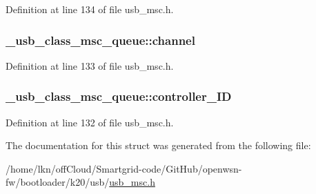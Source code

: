 Definition at line 134 of file usb\+\_\+msc.\+h.

\subsubsection[{\texorpdfstring{channel}{channel}}]{ \+\_\+usb\+\_\+class\+\_\+msc\+\_\+queue\+::channel}\hypertarget{struct__usb__class__msc__queue_a18a7ff1ffec780b13b9723f51ba3f48a}{}\label{struct__usb__class__msc__queue_a18a7ff1ffec780b13b9723f51ba3f48a}


Definition at line 133 of file usb\+\_\+msc.\+h.

\subsubsection[{\texorpdfstring{controller\+\_\+\+ID}{controller_ID}}]{ \+\_\+usb\+\_\+class\+\_\+msc\+\_\+queue\+::controller\+\_\+\+ID}\hypertarget{struct__usb__class__msc__queue_a53fdfed1c2949d468aa938771b4cb864}{}\label{struct__usb__class__msc__queue_a53fdfed1c2949d468aa938771b4cb864}


Definition at line 132 of file usb\+\_\+msc.\+h.



The documentation for this struct was generated from the following file\+:\begin{DoxyCompactItemize}
\item 
/home/lkn/off\+Cloud/\+Smartgrid-\/code/\+Git\+Hub/openwsn-\/fw/bootloader/k20/usb/\hyperlink{usb__msc_8h}{usb\+\_\+msc.\+h}\end{DoxyCompactItemize}

